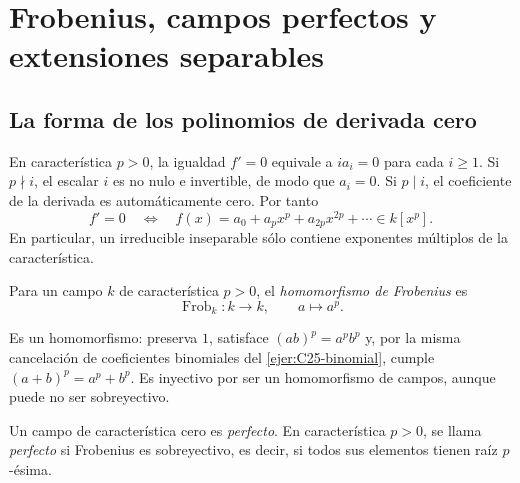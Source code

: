 \section{Frobenius, campos perfectos y extensiones separables}
\subsection{La forma de los polinomios de derivada cero}
En característica $p>0$, la igualdad $f'=0$ equivale a $ia_i=0$ para cada $i\geq1$. Si $p\nmid i$, el escalar $i$ es no nulo e invertible, de modo que $a_i=0$. Si $p\mid i$, el coeficiente de la derivada es automáticamente cero. Por tanto
\[
f'=0\quad\Longleftrightarrow\quad
f(x)=a_0+a_px^p+a_{2p}x^{2p}+\cdots\in k[x^p].
\]
En particular, un irreducible inseparable sólo contiene exponentes múltiplos de la característica.

\begin{defi}
Para un campo $k$ de característica $p>0$, el \emph{homomorfismo de Frobenius} es
\[
\operatorname{Frob}_k:k\longrightarrow k,\qquad a\longmapsto a^p.
\]
\end{defi}
Es un homomorfismo: preserva $1$, satisface $(ab)^p=a^pb^p$ y, por la misma cancelación de coeficientes binomiales del \cref{ejer:C25-binomial}, cumple $(a+b)^p=a^p+b^p$. Es inyectivo por ser un homomorfismo de campos, aunque puede no ser sobreyectivo.

\begin{defi}
Un campo de característica cero es \emph{perfecto}. En característica $p>0$, se llama \emph{perfecto} si Frobenius es sobreyectivo, es decir, si todos sus elementos tienen raíz $p$-ésima.
\end{defi}

